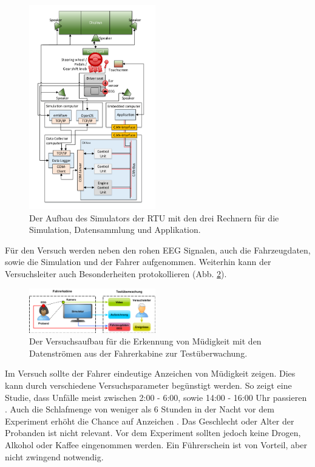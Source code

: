{\begin{figure}[h] 
  \begin{center}
    \includegraphics[width=5.5cm]{architecture}
    \caption[Aufbau des Simulators]{Der Aufbau des Simulators der \acl{RTU} mit den drei Rechnern für die Simulation, Datensammlung und Applikation. \label{fig:architecure}}
  \end{center}
\end{figure}

Für den Versuch werden neben den rohen EEG Signalen, auch die Fahrzeugdaten, sowie die Simulation und der Fahrer aufgenommen. Weiterhin kann der Versuchsleiter auch Besonderheiten protokollieren (Abb. \ref{fig:experiment}).

\begin{figure}[h] 
  \begin{center}
    \includegraphics[width=5.5cm]{experiment}
    \caption[Experiment]{Der Versuchsaufbau für die Erkennung von Müdigkeit mit den Datenströmen aus der Fahrerkabine zur Testüberwachung. \label{fig:experiment}}
  \end{center}
\end{figure}

Im Versuch sollte der Fahrer eindeutige Anzeichen von Müdigkeit zeigen. Dies kann durch verschiedene Versuchsparameter begünstigt werden. So zeigt eine Studie, dass Unfälle meist zwischen 2:00 - 6:00, sowie 14:00 - 16:00 Uhr passieren \cite{Horne_1757738}. Auch die Schlafmenge von weniger als 6 Stunden in der Nacht vor dem Experiment erhöht die Chance auf Anzeichen \cite{Engstrom_2322937}. Das Geschlecht oder Alter der Probanden ist nicht relevant. Vor dem Experiment sollten jedoch keine Drogen, Alkohol oder Kaffee eingenommen werden. Ein Führerschein ist von Vorteil, aber nicht zwingend notwendig.

}
